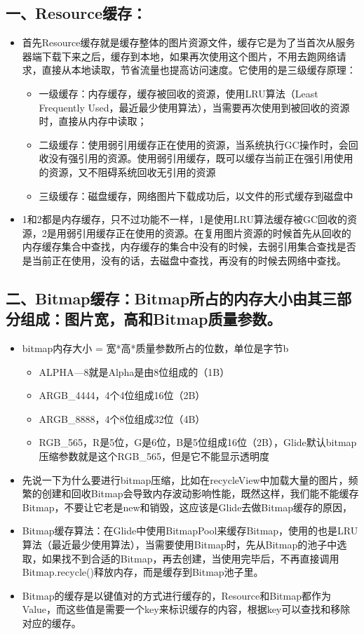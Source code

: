 \documentclass[9pt, b5paper]{article}
\begin{document}
\subsection{一、Resource缓存：}
\label{sec-8-1}
\begin{itemize}
\item 首先Resource缓存就是缓存整体的图片资源文件，缓存它是为了当首次从服务器端下载下来之后，缓存到本地，如果再次使用这个图片，不用去跑网络请求，直接从本地读取，节省流量也提高访问速度。它使用的是三级缓存原理：
\begin{itemize}
\item 一级缓存：内存缓存，缓存被回收的资源，使用LRU算法（Least Frequently Used，最近最少使用算法），当需要再次使用到被回收的资源时，直接从内存中读取；
\item 二级缓存：使用弱引用缓存正在使用的资源，当系统执行GC操作时，会回收没有强引用的资源。使用弱引用缓存，既可以缓存当前正在强引用使用的资源，又不阻碍系统回收无引用的资源
\item 三级缓存：磁盘缓存，网络图片下载成功后，以文件的形式缓存到磁盘中
\end{itemize}
\item 1和2都是内存缓存，只不过功能不一样，1是使用LRU算法缓存被GC回收的资源，2是用弱引用缓存正在使用的资源。在复用图片资源的时候首先从回收的内存缓存集合中查找，内存缓存的集合中没有的时候，去弱引用集合查找是否是当前正在使用，没有的话，去磁盘中查找，再没有的时候去网络中查找。
\end{itemize}
\subsection{二、Bitmap缓存：Bitmap所占的内存大小由其三部分组成：图片宽，高和Bitmap质量参数。}
\label{sec-8-2}
\begin{itemize}
\item bitmap内存大小 = 宽*高*质量参数所占的位数，单位是字节b
\begin{itemize}
\item ALPHA—8就是Alpha是由8位组成的（1B）
\item ARGB\_4444，4个4位组成16位（2B）
\item ARGB\_8888，4个8位组成32位（4B）
\item RGB\_565，R是5位，G是6位，B是5位组成16位（2B），Glide默认bitmap压缩参数就是这个RGB\_565，但是它不能显示透明度
\end{itemize}
\item 先说一下为什么要进行bitmap压缩，比如在recycleView中加载大量的图片，频繁的创建和回收Bitmap会导致内存波动影响性能，既然这样，我们能不能缓存Bitmap，不要让它老是new和销毁，这应该是Glide去做Bitmap缓存的原因，
\item Bitmap缓存算法：在Glide中使用BitmapPool来缓存Bitmap，使用的也是LRU算法（最近最少使用算法），当需要使用Bitmap时，先从Bitmap的池子中选取，如果找不到合适的Bitmap，再去创建，当使用完毕后，不再直接调用Bitmap.recycle()释放内存，而是缓存到Bitmap池子里。
\item Bitmap的缓存是以键值对的方式进行缓存的，Resource和Bitmap都作为Value，而这些值是需要一个key来标识缓存的内容，根据key可以查找和移除对应的缓存。
\end{itemize}
\end{document}
